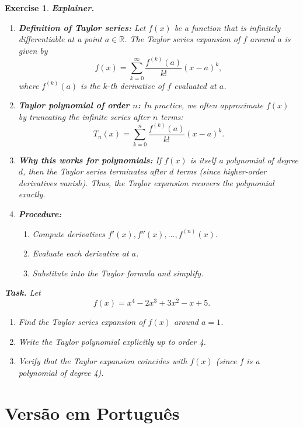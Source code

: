 \documentclass[12pt,a4paper]{article}
\newtheorem{exercise}{Exercise}[section]
\begin{document}
\begin{exercise}
\textbf{Explainer.}

\begin{enumerate}
  \item \textbf{Definition of Taylor series:}  
  Let $f(x)$ be a function that is infinitely differentiable at a point $a \in \mathbb{R}$. The \emph{Taylor series expansion} of $f$ around $a$ is given by
  \[
  f(x) = \sum_{k=0}^{\infty} \frac{f^{(k)}(a)}{k!}(x-a)^k,
  \]
  where $f^{(k)}(a)$ is the $k$-th derivative of $f$ evaluated at $a$.

  \item \textbf{Taylor polynomial of order $n$:}  
  In practice, we often approximate $f(x)$ by truncating the infinite series after $n$ terms:
  \[
  T_n(x) = \sum_{k=0}^{n} \frac{f^{(k)}(a)}{k!}(x-a)^k.
  \]

  \item \textbf{Why this works for polynomials:}  
  If $f(x)$ is itself a polynomial of degree $d$, then the Taylor series terminates after $d$ terms (since higher-order derivatives vanish). Thus, the Taylor expansion recovers the polynomial exactly.

  \item \textbf{Procedure:}  
  \begin{enumerate}[label=(\roman*)]
    \item Compute derivatives $f'(x), f''(x), \ldots, f^{(n)}(x)$.  
    \item Evaluate each derivative at $a$.  
    \item Substitute into the Taylor formula and simplify.  
  \end{enumerate}
\end{enumerate}

\bigskip

\textbf{Task.}  
Let 
\[
f(x) = x^4 - 2x^3 + 3x^2 - x + 5.
\]
\begin{enumerate}[label=(\alph*)]
    \item Find the Taylor series expansion of $f(x)$ around $a = 1$.  
    \item Write the Taylor polynomial explicitly up to order 4.  
    \item Verify that the Taylor expansion coincides with $f(x)$ (since $f$ is a polynomial of degree 4).  
\end{enumerate}
\end{exercise}

\newpage
{}
\section{Versão em Português}
\end{document}
